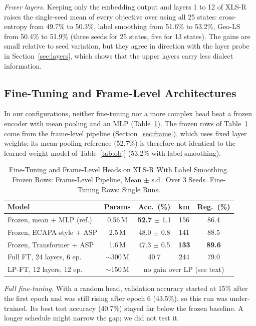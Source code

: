 \documentclass[conference]{IEEEtran}
\begin{document}
\textit{Fewer layers.} Keeping only the embedding output and layers 1 to 12 of XLS-R raises the single-seed mean of every objective over using all 25 states: cross-entropy from 49.7\% to 50.3\%, label smoothing from 51.6\% to 53.2\%, Geo-LS from 50.4\% to 51.9\% (three seeds for 25 states, five for 13 states). The gains are small relative to seed variation, but they agree in direction with the layer probe in Section~\ref{sec:layers}, which shows that the upper layers carry less dialect information.

\subsection{Fine-Tuning and Frame-Level Architectures}
In our configurations, neither fine-tuning nor a more complex head beat a frozen encoder with mean pooling and an MLP (Table~\ref{tab:ft}). The frozen rows of Table~\ref{tab:ft} come from the frame-level pipeline (Section~\ref{sec:frame}), which uses fixed layer weights; its mean-pooling reference (52.7\%) is therefore not identical to the learned-weight model of Table~\ref{tab:obj} (53.2\% with label smoothing).

\begin{table}[t]
\centering
\caption{Fine-Tuning and Frame-Level Heads on XLS-R With Label Smoothing. Frozen Rows: Frame-Level Pipeline, Mean $\pm$ s.d.\ Over 3 Seeds. Fine-Tuning Rows: Single Runs.}
\label{tab:ft}
\setlength{\tabcolsep}{3pt}
\begin{tabular}{@{}lcccc@{}}
\toprule
Model & Params & Acc.\ (\%) & km & Reg.\ (\%) \\
\midrule
Frozen, mean + MLP (ref.) & 0.56\,M & \textbf{52.7} $\pm$ 1.1 & 156 & 86.4 \\
Frozen, ECAPA-style + ASP & 2.5\,M & 48.0 $\pm$ 0.8 & 141 & 88.5 \\
Frozen, Transformer + ASP & 1.6\,M & 47.3 $\pm$ 0.5 & \textbf{133} & \textbf{89.6} \\
Full FT, 24 layers, 6 ep. & ${\sim}$300\,M & 40.7 & 244 & 79.0 \\
LP-FT, 12 layers, 12 ep. & ${\sim}$150\,M & \multicolumn{3}{c}{no gain over LP (see text)} \\
\bottomrule
\end{tabular}
\end{table}

\textit{Full fine-tuning.} With a random head, validation accuracy started at 15\% after the first epoch and was still rising after epoch 6 (43.5\%), so this run was under-trained. Its best test accuracy (40.7\%) stayed far below the frozen baseline. A longer schedule might narrow the gap; we did not test it.
\end{document}

